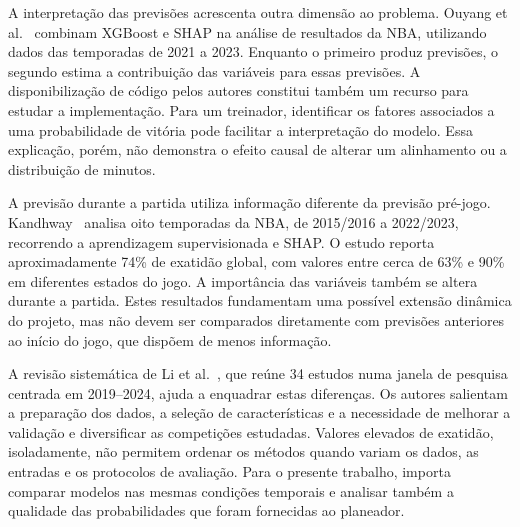 A interpretação das previsões acrescenta outra dimensão ao problema.
Ouyang et al.~\cite{ouyang2024} combinam XGBoost e SHAP na análise de
resultados da NBA, utilizando dados das temporadas de 2021 a 2023.
Enquanto o primeiro produz previsões, o segundo estima a contribuição
das variáveis para essas previsões. A disponibilização de código pelos
autores constitui também um recurso para estudar a implementação.
Para um treinador, identificar os fatores associados a uma probabilidade
de vitória pode facilitar a interpretação do modelo. Essa explicação,
porém, não demonstra o efeito causal de alterar um alinhamento ou a
distribuição de minutos.

A previsão durante a partida utiliza informação diferente da previsão
pré-jogo. Kandhway~\cite{kandhway2025} analisa oito temporadas da NBA,
de 2015/2016 a 2022/2023, recorrendo a aprendizagem supervisionada e SHAP.
O estudo reporta aproximadamente 74\% de exatidão global, com valores
entre cerca de 63\% e 90\% em diferentes estados do jogo. A importância
das variáveis também se altera durante a partida. Estes resultados
fundamentam uma possível extensão dinâmica do projeto, mas não devem
ser comparados diretamente com previsões anteriores ao início do jogo,
que dispõem de menos informação.

A revisão sistemática de Li et al.~\cite{li2025}, que reúne 34 estudos
numa janela de pesquisa centrada em 2019--2024, ajuda a enquadrar estas
diferenças. Os autores salientam a preparação dos dados, a seleção de
características e a necessidade de melhorar a validação e diversificar
as competições estudadas. Valores elevados de exatidão, isoladamente,
não permitem ordenar os métodos quando variam os dados, as entradas e
os protocolos de avaliação. Para o presente trabalho, importa comparar
modelos nas mesmas condições temporais e analisar também a qualidade
das probabilidades que foram fornecidas ao planeador.
